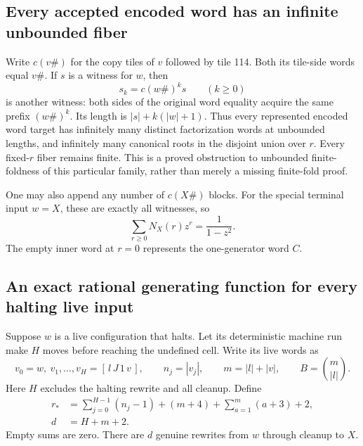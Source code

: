 \documentclass[11pt,letterpaper]{article}
\theoremstyle{definition}
\theoremstyle{remark}
\begin{document}
\subsection{Every accepted encoded word has an infinite unbounded fiber}
Write $c(v\#)$ for the copy tiles of $v$ followed by tile 114. Both its tile-side words equal $v\#$. If $s$ is a witness for $w$, then
\[
 s_k=c(w\#)^k s\qquad(k\geq0)
\]
is another witness: both sides of the original word equality acquire the same prefix $(w\#)^k$. Its length is $|s|+k(|w|+1)$. Thus every represented encoded word target has infinitely many distinct factorization words at unbounded lengths, and infinitely many canonical roots in the disjoint union over $r$. Every fixed-$r$ fiber remains finite. This is a proved obstruction to unbounded finite-foldness of this particular family, rather than merely a missing finite-fold proof.

One may also append any number of $c(X\#)$ blocks. For the special terminal input $w=X$, these are exactly all witnesses, so
\[
 \sum_{r\geq0}N_X(r)z^r=\frac1{1-z^2}.
\]
The empty inner word at $r=0$ represents the one-generator word $C$.

\subsection{An exact rational generating function for every halting live input}
Suppose $w$ is a live configuration that halts. Let its deterministic machine run make $H$ moves before reaching the undefined cell. Write its live words as
\[
 v_0=w,\ v_1,\ldots,v_H=[\,l\,J\,1\,v\,],\qquad
 n_j=|v_j|,\qquad m=|l|+|v|,\qquad B=\binom{m}{|l|}.
\]
Here $H$ excludes the halting rewrite and all cleanup. Define
\begin{align}
 r_*&=\sum_{j=0}^{H-1}(n_j-1)+(m+4)
              +\sum_{a=1}^{m}(a+3)+2,\label{gts:um:eq:rstar}\\
 d&=H+m+2.\label{gts:um:eq:d}
\end{align}
Empty sums are zero. There are $d$ genuine rewrites from $w$ through cleanup to $X$.
\end{document}

